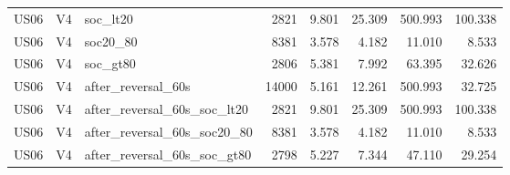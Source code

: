 \begin{tabular}{lllrrrrr}
US06 & V4 & soc\_lt20 & 2821 & 9.801 & 25.309 & 500.993 & 100.338 \\
US06 & V4 & soc20\_80 & 8381 & 3.578 & 4.182 & 11.010 & 8.533 \\
US06 & V4 & soc\_gt80 & 2806 & 5.381 & 7.992 & 63.395 & 32.626 \\
US06 & V4 & after\_reversal\_60s & 14000 & 5.161 & 12.261 & 500.993 & 32.725 \\
US06 & V4 & after\_reversal\_60s\_soc\_lt20 & 2821 & 9.801 & 25.309 & 500.993 & 100.338 \\
US06 & V4 & after\_reversal\_60s\_soc20\_80 & 8381 & 3.578 & 4.182 & 11.010 & 8.533 \\
US06 & V4 & after\_reversal\_60s\_soc\_gt80 & 2798 & 5.227 & 7.344 & 47.110 & 29.254 \\
\hline
\end{tabular}
